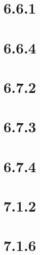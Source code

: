 \documentclass{article}
\title{MATH 100 - PSet #7}
\author{JasonVinh Son}
\date{November 2024}
\begin{document}
\maketitle

\section*{6.6.1}

\section*{6.6.4}

\section*{6.7.2}

\section*{6.7.3}

\section*{6.7.4}

\section*{7.1.2}

\section*{7.1.6}
\end{document}
